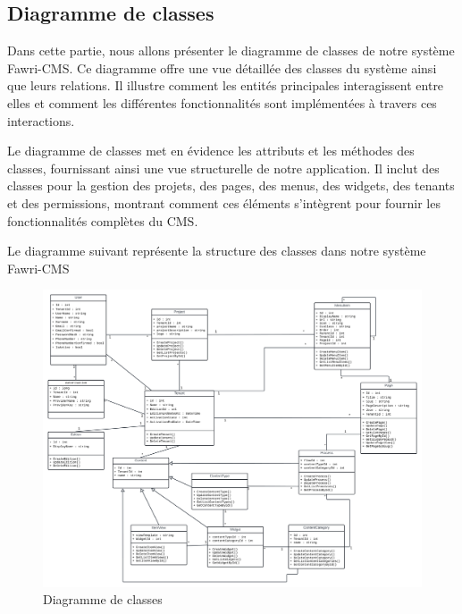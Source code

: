 \subsection{Diagramme de classes}
\hspace{\parindent}Dans cette partie, nous allons présenter le diagramme de classes de notre système Fawri-CMS. Ce diagramme offre une vue détaillée des classes du système ainsi que leurs relations. Il illustre comment les entités principales interagissent entre elles et comment les différentes fonctionnalités sont implémentées à travers ces interactions.

Le diagramme de classes met en évidence les attributs et les méthodes des classes, fournissant ainsi une vue structurelle de notre application. Il inclut des classes pour la gestion des projets, des pages, des menus, des widgets, des tenants et des permissions, montrant comment ces éléments s'intègrent pour fournir les fonctionnalités complètes du CMS.

Le diagramme suivant représente la structure des classes dans notre système Fawri-CMS



\begin{figure}[H]
  \centering
  \includegraphics[width=20cm]{Figures/diag de classe.png}
  \caption{Diagramme de classes}
\end{figure}




